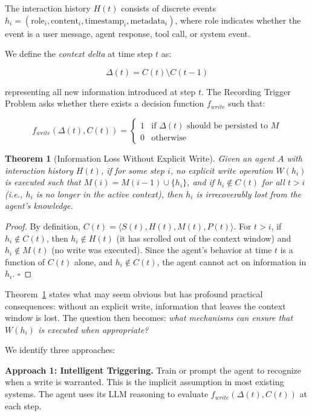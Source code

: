 \documentclass[11pt]{article}
\newtheorem{theorem}{Theorem}
\begin{document}
The interaction history $H(t)$ consists of discrete events $h_i = (\text{role}_i, \text{content}_i, \text{timestamp}_i, \text{metadata}_i)$, where role indicates whether the event is a user message, agent response, tool call, or system event.

We define the \emph{context delta} at time step $t$ as:

\begin{equation}
\Delta(t) = C(t) \setminus C(t-1)
\end{equation}

representing all new information introduced at step $t$. The Recording Trigger Problem asks whether there exists a decision function $f_{write}$ such that:

\begin{equation}
f_{write}(\Delta(t), C(t)) = \begin{cases} 1 & \text{if } \Delta(t) \text{ should be persisted to } M \\ 0 & \text{otherwise} \end{cases}
\end{equation}

\begin{theorem}[Information Loss Without Explicit Write]
\label{thm:loss}
Given an agent $A$ with interaction history $H(t)$, if for some step $i$, no explicit write operation $W(h_i)$ is executed such that $M(i) = M(i-1) \cup \{h_i\}$, and if $h_i \notin C(t)$ for all $t > i$ (i.e., $h_i$ is no longer in the active context), then $h_i$ is irrecoverably lost from the agent's knowledge.
\end{theorem}

\begin{proof}
By definition, $C(t) = \langle S(t), H(t), M(t), P(t) \rangle$. For $t > i$, if $h_i \notin C(t)$, then $h_i \notin H(t)$ (it has scrolled out of the context window) and $h_i \notin M(t)$ (no write was executed). Since the agent's behavior at time $t$ is a function of $C(t)$ alone, and $h_i \notin C(t)$, the agent cannot act on information in $h_i$. $\square$
\end{proof}

Theorem~\ref{thm:loss} states what may seem obvious but has profound practical consequences: without an explicit write, information that leaves the context window is lost. The question then becomes: \emph{what mechanisms can ensure that $W(h_i)$ is executed when appropriate?}

We identify three approaches:

\textbf{Approach 1: Intelligent Triggering.} Train or prompt the agent to recognize when a write is warranted. This is the implicit assumption in most existing systems. The agent uses its LLM reasoning to evaluate $f_{write}(\Delta(t), C(t))$ at each step.
\end{document}
